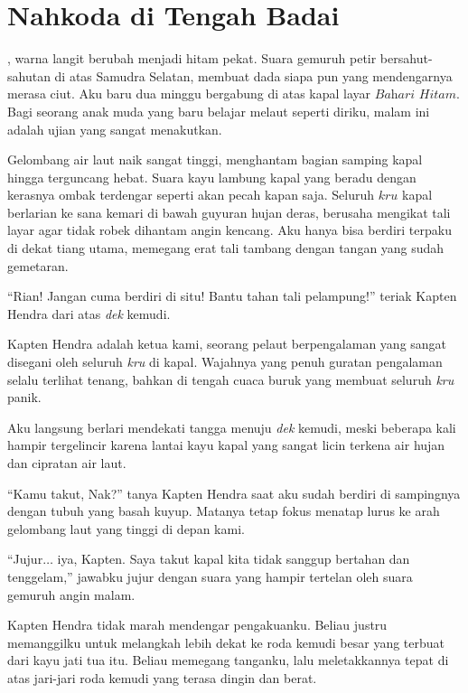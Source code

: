 \chapter*{Nahkoda di Tengah Badai}

, warna langit berubah menjadi hitam pekat. Suara gemuruh petir bersahut-sahutan di atas Samudra Selatan, membuat dada siapa pun yang mendengarnya merasa ciut. Aku baru dua minggu bergabung di atas kapal layar \(\textit{Bahari Hitam}.\) Bagi seorang anak muda yang baru belajar melaut seperti diriku, malam ini adalah ujian yang sangat menakutkan.

Gelombang air laut naik sangat tinggi, menghantam bagian samping kapal hingga terguncang hebat. Suara kayu lambung kapal yang beradu dengan kerasnya ombak terdengar seperti akan pecah kapan saja. Seluruh \(\textit{kru}\) kapal berlarian ke sana kemari di bawah guyuran hujan deras, berusaha mengikat tali layar agar tidak robek dihantam angin kencang. Aku hanya bisa berdiri terpaku di dekat tiang utama, memegang erat tali tambang dengan tangan yang sudah gemetaran.

``Rian! Jangan cuma berdiri di situ! Bantu tahan tali pelampung!'' teriak Kapten Hendra dari atas \textit{dek} kemudi.

Kapten Hendra adalah ketua kami, seorang pelaut berpengalaman yang sangat disegani oleh seluruh \textit{kru} di kapal. Wajahnya yang penuh guratan pengalaman selalu terlihat tenang, bahkan di tengah cuaca buruk yang membuat seluruh \textit{kru} panik.

Aku langsung berlari mendekati tangga menuju \textit{dek} kemudi, meski beberapa kali hampir tergelincir karena lantai kayu kapal yang sangat licin terkena air hujan dan cipratan air laut.

``Kamu takut, Nak?'' tanya Kapten Hendra saat aku sudah berdiri di sampingnya dengan tubuh yang basah kuyup. Matanya tetap fokus menatap lurus ke arah gelombang laut yang tinggi di depan kami.

``Jujur$\dots$ iya, Kapten. Saya takut kapal kita tidak sanggup bertahan dan tenggelam,'' jawabku jujur dengan suara yang hampir tertelan oleh suara gemuruh angin malam.

Kapten Hendra tidak marah mendengar pengakuanku. Beliau justru memanggilku untuk melangkah lebih dekat ke roda kemudi besar yang terbuat dari kayu jati tua itu. Beliau memegang tanganku, lalu meletakkannya tepat di atas jari-jari roda kemudi yang terasa dingin dan berat.

